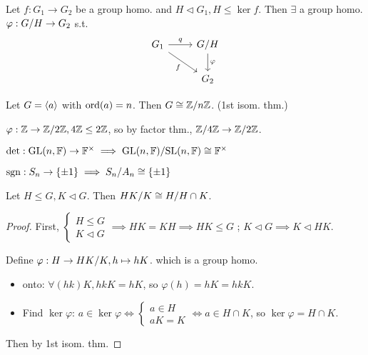 \begin{theorem}
  Let $f: G_1 \to G_2$ be a group homo. and $H \lhd G_1, H \le \ker f$. Then
  $\exists$ a group homo. $\varphi: {G}/{H} \to G_2$ s.t.
  \[
    \begin{tikzcd}
      G_1 \arrow{r}{q} \arrow[swap]{dr}{f} & \quot{G}{H} \arrow{d}{\varphi} \\
      & G_2
    \end{tikzcd}
  \]
\end{theorem}

\begin{example}
  Let $G = \langle a\rangle$ with $\operatorname{ord}(a) = n$. Then $G \cong {\mathbb{Z}}/{n\mathbb{Z}}$.
  (1st isom. thm.)
\end{example}

\begin{example}
  $\varphi: \mathbb{Z} \to {\mathbb{Z}}/{2\mathbb{Z}}, 4\mathbb{Z} \le 2\mathbb{Z}$, so by factor thm.,
  ${\mathbb{Z}}/{4\mathbb{Z}} \to {\mathbb{Z}}/{2\mathbb{Z}}$.
\end{example}

\begin{example}
  $\det: \text{GL}(n, \mathbb{F}) \to \mathbb{F}^\times \implies
  {\text{GL}(n, \mathbb{F})}/{\text{SL}(n, \mathbb{F})} \cong \mathbb{F}^\times$
\end{example}

\begin{example}
  $\operatorname{sgn}: S_n \to \{ \pm 1 \} \implies {S_n}/{A_n} \cong \{ \pm 1 \}$
\end{example}

\begin{theorem}
  Let $H \le G, K \lhd G$. Then ${HK}/{K} \cong {H}/{H\cap K}$.
  \begin{proof}
    First, $\begin{cases}H\le G \\ K \lhd G\end{cases} \implies HK = KH
      \implies HK \le G$ ; $K \lhd G \implies K \lhd HK$.

    Define $\varphi: H \to {HK}/{K}, h \mapsto hK$. which is a group homo.
    \begin{itemize}
      \item onto: $\forall (hk) K, hkK = hK$, so $\varphi(h) = hK = hkK$.
      \item Find $\ker \varphi$: $a \in \ker \varphi \iff \begin{cases}
          a \in H \\
          aK = K
        \end{cases} \iff a \in H \cap K$, so $\ker \varphi = H\cap K$.
    \end{itemize}
    Then by 1st isom. thm.
  \end{proof}
\end{theorem}

